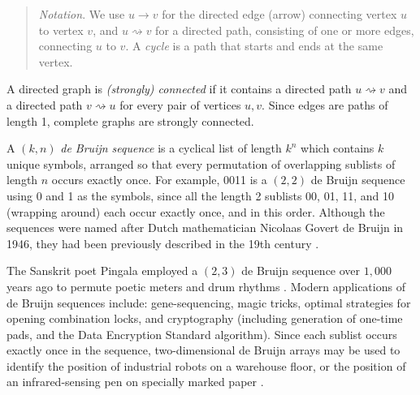 \documentclass[12pt]{article}
\begin{document}
\begin{quote}\raggedright\emph{Notation}. We use $u \rightarrow v$ for the directed edge (arrow) connecting vertex $u$ to vertex $v$, and $u \rightsquigarrow v$ for a directed path, consisting of one or more edges, connecting $u$ to $v$. A \emph{cycle\/} is a path that starts and ends at the same vertex.\end{quote}

A directed graph is \emph{(strongly) connected\/} if it contains a directed path $u \rightsquigarrow v$ and a directed path $v \rightsquigarrow u$ for every pair of vertices $u,v$. Since edges are paths of length 1, complete graphs are strongly connected.


A $(k,n)$ \emph{de Bruijn sequence\/} is a cyclical list of length $k^n$ which contains $k$ unique symbols, arranged so that every permutation of overlapping sublists of length $n$ occurs exactly once. For example, 0011 is a $(2,2)$ de Bruijn sequence using 0 and 1 as the symbols, since all the length 2 sublists 00, 01, 11, and 10 (wrapping around) each occur exactly once, and in this order.
Although the sequences were named after Dutch mathematician Nicolaas Govert de Bruijn \cite{debruijn} in 1946, they had been previously described in the  19th century \cite{fleury,sainte-marie}.

The Sanskrit poet Pingala employed a $(2,3)$ de Bruijn sequence over $1,000$ years ago to permute poetic meters and drum rhythms \cite{hall,knuth4a}. Modern applications of de Bruijn sequences include: gene-sequencing, magic tricks, optimal strategies for opening combination locks, and cryptography (including generation of one-time pads, and the Data Encryption Standard algorithm). Since each sublist occurs exactly once in the sequence, two-dimensional de Bruijn arrays may be used to identify the position of industrial robots on a warehouse floor, or the position of an infrared-sensing pen on specially marked paper \cite{diaconis}.
\end{document}
